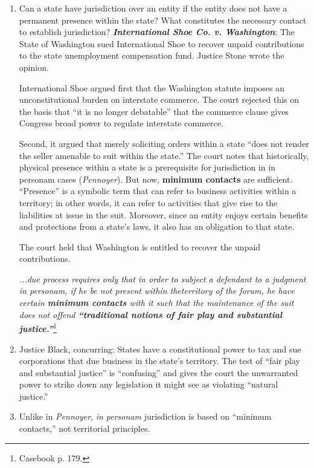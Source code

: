 \begin{enumerate}
    \item Can a state have jurisdiction over an entity if the entity does not have a permanent presence within the state? What constitutes the necessary contact to establish jurisdiction? \textbf{\emph{International Shoe Co. v. Washington}}: The State of Washington sued International Shoe to recover unpaid contributions to the state unemployment compensation fund. Justice Stone wrote the opinion.

    International Shoe argued first that the Washington statute imposes an unconstitutional burden on interstate commerce. The court rejected this on the basis that ``it is no longer debatable'' that the commerce clause gives Congress broad power to regulate interstate commerce.

    Second, it argued that merely soliciting orders within a state ``does not render the seller amenable to suit within the state.'' The court notes that historically, physical presence within a state is a prerequisite for jurisdiction in in personam cases (\emph{Pennoyer}). But now, \textbf{minimum contacts} are sufficient. ``Presence'' is a symbolic term that can refer to business activities within a territory; in other words, it can refer to activities that give rise to the liabilities at issue in the suit. Moreover, since an entity enjoys certain benefits and protections from a state's laws, it also has an obligation to that state.

    The court held that Washington is entitled to recover the unpaid contributions.

\emph{...due process requires only that in order to subject a defendant to a judgment in personam, if he be not present within theterritory of the forum, he have certain \textbf{minimum contacts} with it such that the maintenance of the suit does not offend \textbf{``traditional notions of fair play and substantial justice.''}}\footnote{Casebook p. 179.}
    \item Justice Black, concurring: States have a constitutional power to tax and sue corporations that due business in the state's territory. The test of ``fair play and substantial justice'' is ``confusing'' and gives the court the unwarranted power to strike down any legislation it might see as violating ``natural justice.''
    \item Unlike in \emph{Pennoyer}, \emph{in personam} jurisdiction is based on ``minimum contacts,'' not territorial principles.
\end{enumerate}

